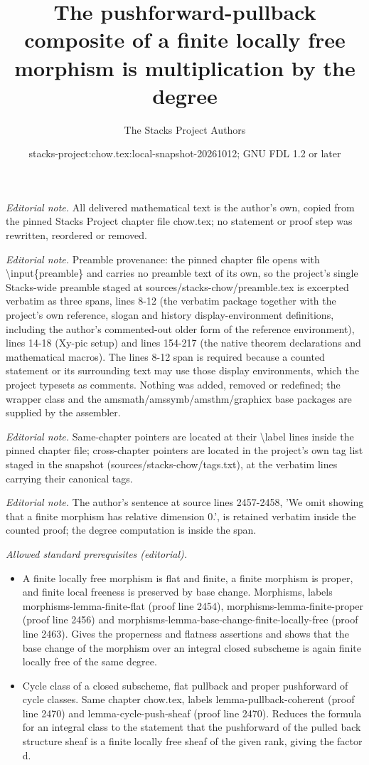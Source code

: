 \documentclass[10pt,a4paper]{amsart}
\title{The pushforward-pullback composite of a finite locally free morphism is multiplication by the degree}
\author{The Stacks Project Authors}
\date{stacks-project:chow.tex:local-snapshot-20261012; GNU FDL 1.2 or later}
\theoremstyle{plain}
\theoremstyle{definition}
\theoremstyle{remark}
\numberwithin{equation}{subsection}
\begin{document}
\maketitle
\noindent\textit{Editorial note.} All delivered mathematical text is the author's own, copied from the pinned Stacks Project chapter file chow.tex; no statement or proof step was rewritten, reordered or removed.\par\medskip
\noindent\textit{Editorial note.} Preamble provenance: the pinned chapter file opens with \textbackslash{}input\{preamble\} and carries no preamble text of its own, so the project's single Stacks-wide preamble staged at sources/stacks-chow/preamble.tex is excerpted verbatim as three spans, lines 8-12 (the verbatim package together with the project's own reference, slogan and history display-environment definitions, including the author's commented-out older form of the reference environment), lines 14-18 (Xy-pic setup) and lines 154-217 (the native theorem declarations and mathematical macros). The lines 8-12 span is required because a counted statement or its surrounding text may use those display environments, which the project typesets as comments. Nothing was added, removed or redefined; the wrapper class and the amsmath/amssymb/amsthm/graphicx base packages are supplied by the assembler.\par\medskip
\noindent\textit{Editorial note.} Same-chapter pointers are located at their \textbackslash{}label lines inside the pinned chapter file; cross-chapter pointers are located in the project's own tag list staged in the snapshot (sources/stacks-chow/tags.txt), at the verbatim lines carrying their canonical tags.\par\medskip
\noindent\textit{Editorial note.} The author's sentence at source lines 2457-2458, 'We omit showing that a finite morphism has relative dimension 0.', is retained verbatim inside the counted proof; the degree computation is inside the span.\par\medskip
\noindent\textit{Allowed standard prerequisites (editorial).}\begin{itemize}
\item A finite locally free morphism is flat and finite, a finite morphism is proper, and finite local freeness is preserved by base change. Morphisms, labels morphisms-lemma-finite-flat (proof line 2454), morphisms-lemma-finite-proper (proof line 2456) and morphisms-lemma-base-change-finite-locally-free (proof line 2463). Gives the properness and flatness assertions and shows that the base change of the morphism over an integral closed subscheme is again finite locally free of the same degree.
\item Cycle class of a closed subscheme, flat pullback and proper pushforward of cycle classes. Same chapter chow.tex, labels lemma-pullback-coherent (proof line 2470) and lemma-cycle-push-sheaf (proof line 2470). Reduces the formula for an integral class to the statement that the pushforward of the pulled back structure sheaf is a finite locally free sheaf of the given rank, giving the factor d.
\end{itemize}\medskip
\end{document}
